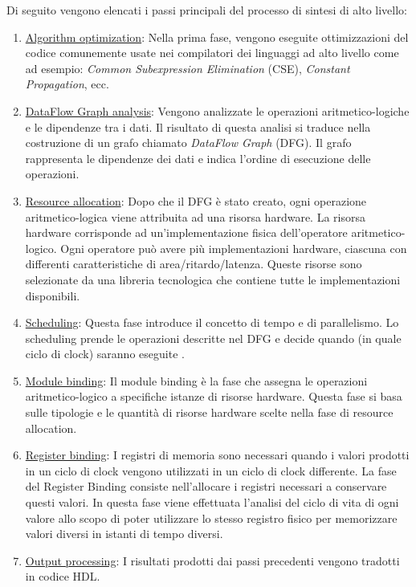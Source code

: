 Di seguito vengono elencati i passi principali del processo di sintesi di alto livello:
\begin{enumerate}
	\item \underline{Algorithm optimization}: Nella prima fase, vengono eseguite ottimizzazioni del codice comunemente usate nei compilatori dei linguaggi ad alto livello come ad esempio: \textit{Common Subexpression Elimination} (CSE), \textit{Constant Propagation}, ecc.
	\item \underline{DataFlow Graph analysis}: Vengono analizzate le operazioni aritmetico-logiche e le dipendenze tra i dati. Il risultato di questa analisi si traduce nella costruzione di un grafo chiamato \textit{DataFlow Graph} (DFG). Il grafo rappresenta le dipendenze dei dati e indica l'ordine di esecuzione delle operazioni.
	\item \underline{Resource allocation}: Dopo che il DFG è stato creato, ogni operazione aritmetico-logica viene attribuita ad una risorsa hardware. La risorsa hardware corrisponde ad un'implementazione fisica dell'operatore aritmetico-logico. Ogni operatore può avere più implementazioni hardware, ciascuna con differenti caratteristiche di area/ritardo/latenza. Queste risorse sono selezionate da una libreria tecnologica che contiene tutte le implementazioni disponibili.
	\item \underline{Scheduling}: Questa fase introduce il concetto di tempo e di parallelismo. Lo scheduling prende le operazioni descritte nel DFG e decide quando (in quale ciclo di clock) saranno eseguite \cite{bluebook}.
	\item \underline{Module binding}: Il module binding è la fase che assegna le operazioni aritmetico-logico a specifiche istanze di risorse hardware. Questa fase si basa sulle tipologie e le quantità di risorse hardware scelte nella fase di resource allocation.
	\item \underline{Register binding}: I registri di memoria sono necessari quando i valori prodotti in un ciclo di clock vengono utilizzati in un ciclo di clock differente. La fase del Register Binding consiste nell'allocare i registri necessari a conservare questi valori. In questa fase viene effettuata l'analisi del ciclo di vita di ogni valore allo scopo di poter utilizzare lo stesso registro fisico per memorizzare valori diversi in istanti di tempo diversi.
	\item \underline{Output processing}: I risultati prodotti dai passi precedenti vengono tradotti in codice HDL.
\end{enumerate}

